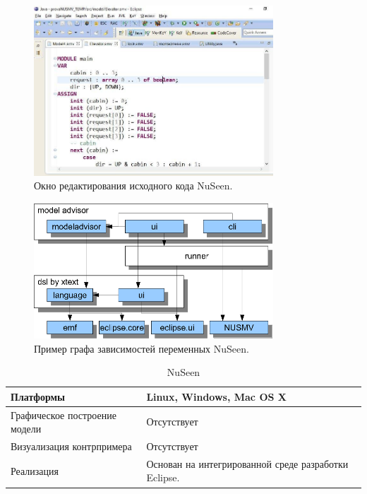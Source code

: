 \begin{figure}[htbp]
	\centering
	\includegraphics[width=0.8\textwidth]{fig/nuseen1.png}
	\caption{Окно редактирования исходного кода NuSeen.}
	\label{fig:nuseen1}
\end{figure}

\begin{figure}[htbp]
	\centering
	\includegraphics[width=0.8\textwidth]{fig/nuseen2.png}
	\caption{Пример графа зависимостей переменных NuSeen.}
	\label{fig:nuseen2}
\end{figure}

\begin{table}[ht]
	\caption{NuSeen}\label{tab:nuseen}
	\centering
	\begin{tabular}{|m{2.5 cm}|m{7.5 cm}|}
		\hline
		Платформы & Linux, Windows, Mac OS X \\
		\hline
		Графическое построение модели & Отсутствует \\
		\hline
		Визуализация контрпримера & Отсутствует \\
		\hline
		Реализация & Основан на интегрированной среде разработки Eclipse.\\
		\hline
	\end{tabular}
\end{table}

